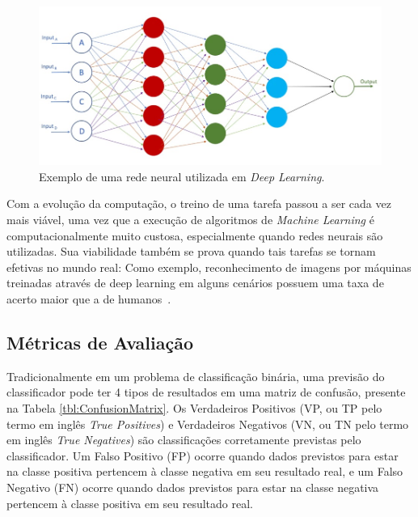 \documentclass[portugues]{ic-tese}
\begin{document}
\begin{figure}[h]
\centering
\includegraphics[scale=0.8]{images/deep_neural_network.jpg}
\caption {Exemplo de uma rede neural utilizada em \textit{Deep Learning}.}
\label{fig:NeuralNetwork}
\end{figure}

Com a evolução da computação, o treino de uma tarefa passou a ser cada vez mais viável, uma vez que a execução de algoritmos de \textit{Machine Learning} é computacionalmente muito custosa, especialmente quando redes neurais são utilizadas. Sua viabilidade também se prova quando tais tarefas se tornam efetivas no mundo real: Como exemplo, reconhecimento de imagens por máquinas treinadas através de deep learning em alguns cenários possuem uma taxa de acerto maior que a de humanos~\citep{Copeland_2016}.

\subsection{Métricas de Avaliação}
\label{sec:EvaluationMetrics}

Tradicionalmente em um problema de classificação binária, uma previsão do classificador pode ter 4 tipos de resultados em uma matriz de confusão, presente na Tabela \ref{tbl:ConfusionMatrix}. Os Verdadeiros Positivos (VP, ou TP pelo termo em inglês \textit{True Positives}) e Verdadeiros Negativos (VN, ou TN pelo termo em inglês \textit{True Negatives}) são classificações corretamente previstas pelo classificador. Um Falso Positivo (FP) ocorre quando dados previstos para estar na classe positiva pertencem à classe negativa em seu resultado real, e um Falso Negativo (FN) ocorre quando dados previstos para estar na classe negativa pertencem à classe positiva em seu resultado real.
\end{document}
